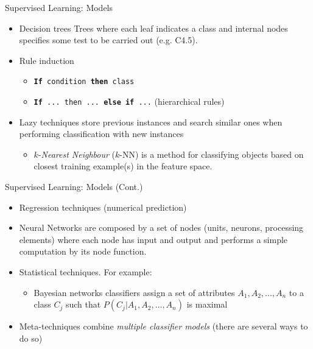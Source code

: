 \documentclass{beamer}
\begin{document}
\begin{frame}{Supervised Learning: Models}

\begin{itemize}
\item \alert{Decision trees} Trees where each leaf indicates a class and internal nodes specifies some test to be carried out (e.g. C4.5). 

\item \alert{Rule induction}
  \begin{itemize}
  \item \texttt{\textbf{If} condition \textbf{then} class} 
  \item \texttt{\textbf{If} ... \texttt{then} ... \textbf{else if} ...} (hierarchical rules)
  \end{itemize}

\item \alert{Lazy techniques} store previous instances and search similar ones when performing classification with new instances
  \begin{itemize}
  \item $k$-\emph{Nearest Neighbour} ($k$-NN) is a method for classifying objects based on closest training example(s) in the feature space.
  \end{itemize}
       
\end{itemize}

\end{frame}

\begin{frame}{Supervised Learning: Models (Cont.)}

\begin{itemize}
\item \alert{Regression} techniques (numerical prediction)
\item \alert{Neural Networks} are composed by a set of nodes (units, neurons, processing elements) where each node has input and output and performs a simple computation by its node function.

\item \alert{Statistical techniques}. For example:
    \begin{itemize}
    \item Bayesian networks classifiers assign a set of attributes $A_1, A_2,..., A_n$ to a class $C_j$ such that $P(C_j | A_1, A_2,\ldots, A_n)$ is maximal
    \end{itemize}

\item \alert{Meta-techniques} combine \emph{multiple classifier models} (there are several ways to do so)          
\end{itemize}

\end{frame}
\end{document}
